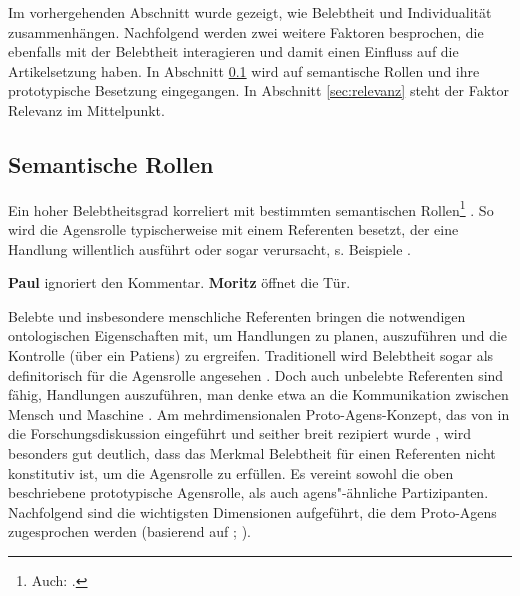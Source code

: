 Im vorhergehenden Abschnitt wurde gezeigt, wie Belebtheit und Individualität zusammenhängen. Nachfolgend werden zwei weitere Faktoren besprochen, die ebenfalls mit der Belebtheit interagieren und damit einen Einfluss auf die Artikelsetzung haben. In Abschnitt \ref{sec:partizipanten} wird auf semantische Rollen und ihre prototypische Besetzung eingegangen. In Abschnitt \ref{sec:relevanz} steht der Faktor Relevanz im Mittelpunkt.
 
\subsection{Semantische Rollen}\label{sec:partizipanten}

Ein hoher Belebtheitsgrad korreliert mit bestimmten semantischen Rollen\footnote{Auch:  \parencite[vgl.][]{Lehmann2004a}.} \parencite[vgl. u.a.][]{Hopper1980,Comrie1989,Yamamoto2006}. So wird die Agensrolle typischerweise mit einem Referenten besetzt, der eine Handlung willentlich ausführt oder sogar verursacht, s. Beispiele .

\begin{exe}
	\ex \label{ex:agens}
	\begin{xlist}
		\ex \label{ex:voll} \textbf{Paul} ignoriert den Kommentar. 
 		\ex \label{ex:verursacher} \textbf{Moritz} öffnet die Tür.
	\end{xlist}
\end{exe}

\noindent 
Belebte und insbesondere menschliche Referenten bringen die notwendigen ontologischen Eigenschaften mit, um Handlungen zu planen,  auszuführen und die Kontrolle (über ein Patiens) zu ergreifen. Traditionell wird Belebtheit sogar als definitorisch für die Agensrolle angesehen \parencite[16]{Primus2012}. 
Doch auch unbelebte Referenten sind fähig, Handlungen auszuführen, man denke etwa an die  Kommunikation zwischen Mensch und Maschine \parencite[s. weiterführend][18]{Primus2012}. Am mehrdimensionalen Proto-Agens-Konzept, das von \parencite{Dowty1991} in die Forschungsdiskussion eingeführt und seither breit rezipiert wurde \parencite[vgl. u.a.][]{Ackermann2001,Primus2012,Szczepaniak2016}, wird besonders gut deutlich, dass das Merkmal Belebtheit für einen Referenten nicht konstitutiv ist, um die Agensrolle zu erfüllen. Es vereint sowohl die oben beschriebene prototypische Agensrolle, als auch agens"-ähnliche Partizipanten. Nachfolgend sind die wichtigsten Dimensionen aufgeführt, die dem Proto-Agens zugesprochen werden  (basierend auf \cite[][572f.]{Dowty1991};   \cite[25]{Primus2012}).  

